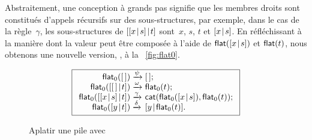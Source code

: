 Abstraitement, une conception à grands pas signifie que les membres
droits sont constitués d'appels récursifs sur des sous-structures, par
exemple, dans le cas de la règle~\(\gamma\), les sous-structures de
\([{[{x}\!\mid\!{s}]}\!\mid\!{t}]\) sont~\(x\), \(s\), \(t\) et
\([{x}\!\mid\!{s}]\). En réfléchissant à la manière dont la valeur peut
être composée à l'aide de
\(\textsf{flat}([{x}\!\mid\!{s}])\) et
\(\textsf{flat}(t)\), nous obtenons une nouvelle version,
, à la
\fig~\vref{fig:flat0}.
\begin{figure}
\begin{equation*}
\boxed{%
\begin{array}{r@{\;}l@{\;}l}
\fun{flat}_0(\el)                   & \xrightarrow{\smash{\psi}}
                                    & \el;\\
\fun{flat}_0(\cons{\el}{t})         & \xrightarrow{\smash{\omega}}
                                    & \fun{flat}_0(t);\\
\fun{flat}_0(\cons{\cons{x}{s}}{t}) & \xrightarrow{\smash{\gamma}}
        & \fun{cat}(\fun{flat}_0(\cons{x}{s}),\fun{flat}_0(t));\\
\fun{flat}_0(\cons{y}{t})           & \xrightarrow{\smash{\delta}}
                                    & \cons{y}{\fun{flat}_0(t)}.
\end{array}}
\end{equation*}
\caption{Aplatir une pile avec }
\label{fig:flat0}
\end{figure}

